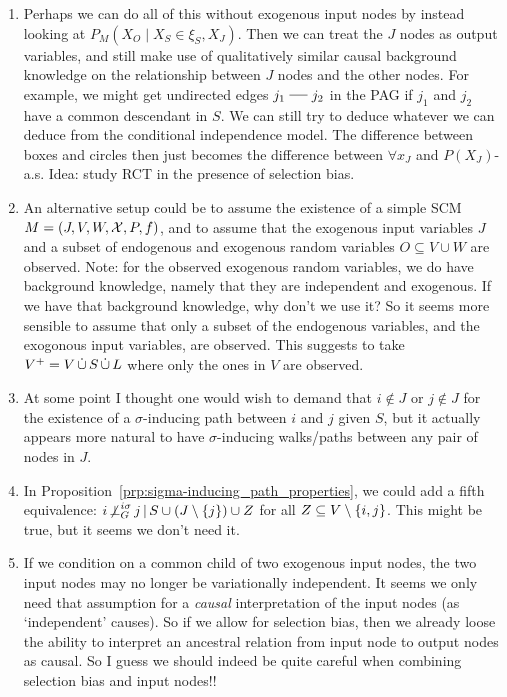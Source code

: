{\begin{enumerate}
  \item Perhaps we can do all of this without exogenous input nodes by instead looking at $P_{M}(X_O \mid X_S \in \xi_S, X_J)$.
Then we can treat the $J$ nodes as output variables, and still make use of qualitatively similar causal background knowledge
on the relationship between $J$ nodes and the other nodes. For example, we might get undirected edges $j_1 \tut j_2$ in the PAG
if $j_1$ and $j_2$ have a common descendant in $S$. We can still try to deduce whatever we can deduce from the conditional
independence model. The difference between boxes and circles then just becomes the difference between $\forall x_J$ and 
$P(X_J)$-a.s. Idea: study RCT in the presence of selection bias.

\item An alternative setup could be to assume the existence of a simple SCM $M = \left ( J, V, W, \mathcal{X}, P, f \right )$, and to
assume that the exogenous input variables $J$ and a subset of endogenous and exogenous random variables $O \subseteq V \cup W$ are observed. 
Note: for the observed exogenous random variables, we do have background knowledge, namely that they are independent and exogenous. 
If we have that background knowledge, why don't we use it? 
So it seems more sensible to assume that only a subset of the endogenous variables, and the exogonous input variables, are observed. 
This suggests to take $V^+ = V \,\dot{\cup}\, S \,\dot{\cup}\, L$ where only the ones in $V$ are observed.

 \item At some point I thought one would wish to demand that $i \notin J$ or $j \notin J$ for the existence of a $\sigma$-inducing path between $i$ and $j$ given $S$, but it actually appears more natural to have $\sigma$-inducing walks/paths between any pair of nodes in $J$.

 \item In Proposition~\ref{prp:sigma-inducing_path_properties}, we could add a fifth equivalence:
    $i \operatorname*{\not\perp}^{i\sigma}_G j \operatorname*{|} S \cup (J \setminus \{j\}) \cup Z$ for all $Z \subseteq V \setminus \{i,j\}$.
   This might be true, but it seems we don't need it.

  \item If we condition on a common child of two exogenous input nodes, the two input nodes may no longer be variationally independent. It seems we only need that assumption for a \emph{causal} interpretation of the input nodes (as `independent' causes). So if we allow for selection bias, then we already loose the ability to interpret an ancestral relation from input node to output nodes as causal. So I guess we should indeed be quite careful when combining selection bias and input nodes!!


\end{enumerate}}
